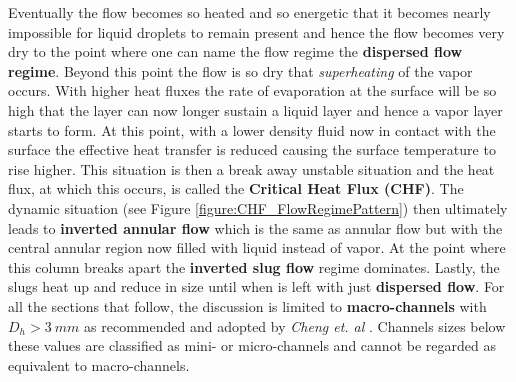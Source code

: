 \documentclass[11pt,letterpaper,titlepage]{article}
\begin{document}
\newline
\newline
Eventually the flow becomes so heated and so energetic that it becomes nearly impossible for liquid droplets to remain present and hence the flow becomes very dry to the point where one can name the flow regime the \textbf{dispersed flow regime}. Beyond this point the flow is so dry that \textit{superheating} of the vapor occurs.
\newline
\newline
With higher heat fluxes the rate of evaporation at the surface will be so high that the layer can now longer sustain a liquid layer and hence a vapor layer starts to form. At this point, with a lower density fluid now in contact with the surface the effective heat transfer is reduced causing the surface temperature to rise higher. This situation is then a break away unstable situation and the heat flux, at which this occurs, is called the \textbf{Critical Heat Flux (CHF)}. The dynamic situation (see Figure \ref{figure:CHF_FlowRegimePattern}) then ultimately leads to  \textbf{inverted annular flow} which is the same as annular flow but with the central annular region now filled with liquid instead of vapor. At the point where this column breaks apart the \textbf{inverted slug flow} regime dominates. Lastly, the slugs heat up and reduce in size until when is left with just \textbf{dispersed flow}.
\newline
\newline
For all the sections that follow, the discussion is limited to \textbf{macro-channels} with $D_h>3 \ mm$ as recommended and adopted by \textit{Cheng et. al} \cite{ChengEtAl}. Channels sizes below these values are classified as mini- or micro-channels and cannot be regarded as equivalent to macro-channels.
\end{document}
